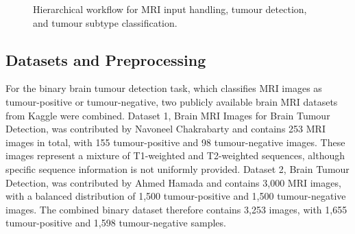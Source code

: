 \documentclass[final,3p,times,number]{elsarticle}
\begin{document}
\begin{figure}[H]
\centering
{}
\caption{Hierarchical workflow for MRI input handling, tumour detection, and tumour subtype classification.}
\label{fig:hierarchical-workflow}
\end{figure}

\subsection{Datasets and Preprocessing}

For the binary brain tumour detection task, which classifies MRI images as tumour-positive or tumour-negative, two publicly available brain MRI datasets from Kaggle were combined. Dataset 1, Brain MRI Images for Brain Tumour Detection, was contributed by Navoneel Chakrabarty and contains 253 MRI images in total, with 155 tumour-positive and 98 tumour-negative images. These images represent a mixture of T1-weighted and T2-weighted sequences, although specific sequence information is not uniformly provided. Dataset 2, Brain Tumour Detection, was contributed by Ahmed Hamada and contains 3,000 MRI images, with a balanced distribution of 1,500 tumour-positive and 1,500 tumour-negative images. The combined binary dataset therefore contains 3,253 images, with 1,655 tumour-positive and 1,598 tumour-negative samples.
\end{document}
